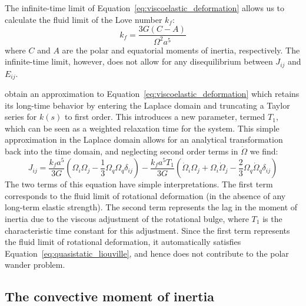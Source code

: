 \documentclass[extra,mreferee]{gji}
\begin{document}
The infinite-time limit of Equation~\eqref{eq:viscoelastic_deformation} allows us to calculate the fluid limit of the Love number $k_f$:
\begin{equation}
k_f = \frac{3 G (C-A)}{\Omega^2 a^5}
\label{eq:fluid_love}
\end{equation}
where $C$ and $A$ are the polar and equatorial moments of inertia, respectively.
The infinite-time limit, however, does not allow for any disequilibrium between $J_{ij}$ and $E_{ij}$.

\citet{ricard1993polar} obtain an approximation to Equation~\eqref{eq:viscoelastic_deformation} which retains its long-time behavior by entering the Laplace domain and truncating a Taylor series for $k(s)$ to first order.  
This introduces a new parameter, termed $T_1$, which can be seen as a weighted relaxation time for the system.  
This simple approximation in the Laplace domain allows for an analytical transformation back into the time domain, and neglecting second order terms in $\dot{\Omega}$ we find:
\begin{equation}
J_{ij} = \frac{k_f a^5}{3 G} \left( \Omega_i \Omega_j - \frac{1}{3} \Omega_q \Omega_q \delta_{ij} \right) -
 \frac{k_f a^5 T_1}{3G} \left(\dot{\Omega}_i \Omega_j + \Omega_i \dot{\Omega}_j - \frac{2}{3} \Omega_q \dot{\Omega}_q \delta_{ij} \right)
\label{eq:rotational_deformation}
\end{equation}
The two terms of this equation have simple interpretations.  
The first term corresponds to the fluid limit of rotational deformation (in the absence of any long-term elastic strength).  
The second term represents the lag in the moment of inertia due to the viscous adjustment of the rotational bulge, where $T_1$ is the characteristic time constant for this adjustment.
Since the first term represents the fluid limit of rotational deformation, it automatically satisfies Equation~\eqref{eq:quasistatic_liouville}, and hence does not contribute to the polar wander problem.

\subsection{The convective moment of inertia}
\label{sec:convective_moment}
\end{document}
